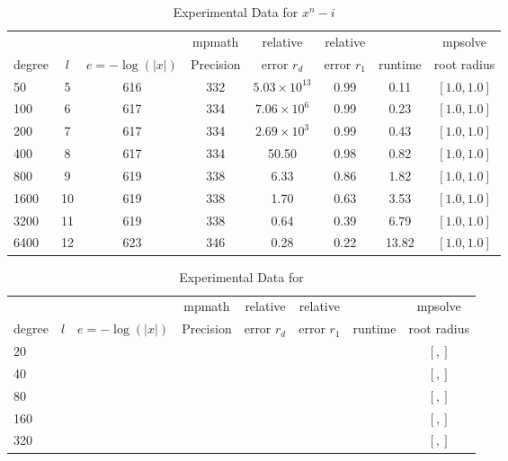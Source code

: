 \documentclass[sigconf]{acmart}
\begin{document}
\begin{table}[t]
\caption{Experimental Data for $x^n - i$}
\label{tab:nrooti}
\vskip 0.15in
\begin{center}
\begin{small}
\begin{sc}
\begin{tabular}{lccccccc}
\toprule
&  &  & mpmath & relative  & relative &  & mpsolve \\
degree  & $l$& $e=-\log(|x|)$& Precision &error $r_d$       & error $r_1$ &runtime& root radius\\
\midrule
    50 & 5 & 616 & 332 & $5.03 \times 10^{13}$ & 0.99 & 0.11 & $[1.0, 1.0]$ \\
  100 & 6 & 617 & 334 & $7.06 \times 10^{6}$ & 0.99 & 0.23 & $[1.0, 1.0]$ \\%
  200 & 7 & 617 & 334 & $2.69 \times 10^{3}$ & 0.99 & 0.43 &  $[1.0, 1.0]$ \\
  400 & 8 & 617 & 334 & 50.50 & 0.98 & 0.82 & $[1.0, 1.0]$ \\
  800 & 9 &  619 & 338 & 6.33 & 0.86 & 1.82 & $[1.0, 1.0]$ \\
1600 &10& 619 & 338 & 1.70 & 0.63 & 3.53 & $[1.0, 1.0]$ \\
3200 &11& 619 & 338 & 0.64 & 0.39 & 6.79 & $[1.0, 1.0]$ \\
6400 &12& 623 & 346 & 0.28 & 0.22 & 13.82 & $[1.0, 1.0]$ \\
\bottomrule
\end{tabular}
\end{sc}
\end{small}
\end{center}
\vskip -0.1in
\end{table}


\begin{table}[t]
\caption{Experimental Data for }
\label{tab:template}
\vskip 0.15in
\begin{center}
\begin{small}
\begin{sc}
\begin{tabular}{lccccccc}
\toprule
&  &  & mpmath & relative  & relative &  & mpsolve \\
degree  & $l$& $e=-\log(|x|)$& Precision &error $r_d$       & error $r_1$ &runtime& root radius\\
\midrule
   20 &  &  &  &  &  &  & $[,]$ \\
   40 &  &  &  &  &  &  & $[,]$\\
   80 &  &  &  &  &  &  & $[,]$\\
 160 &  &  &  &  &  &  & $[,]$\\
 320 &  &  &  &  &  &  & $[,]$\\
\bottomrule
\end{tabular}
\end{sc}
\end{small}
\end{center}
\vskip -0.1in
\end{table}
\end{document}
